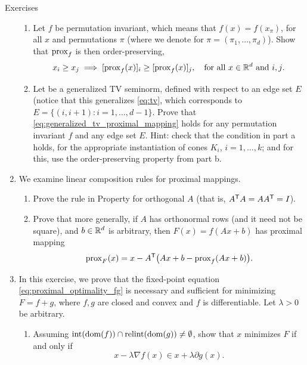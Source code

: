 \begin{xcb}{Exercises}
\begin{enumerate}[label=\thechapter.\arabic*]
\begin{enumerate}[label=\alph*.]
\item Let $f$ be permutation invariant, which means that $f(x) = f(x_\pi)$, for
  all $x$ and permutations $\pi$ (where we denote  for $\pi=(\pi_1,\dots,\pi_d)$). Show that $\operatorname{prox}_f$ is
  then order-preserving,  
 \[
 x_i \geq x_j \implies [\operatorname{prox}_f(x)]_i \geq [\operatorname{prox}_f(x)]_j, \quad \text{for all
   $x \in \mathbb{R}^d$ and $i,j$}.
 \]

\item Let  be a
  generalized TV seminorm, defined with respect to an edge set $E$ (notice that  
  this generalizes \eqref{eq:tv}, which corresponds to $E = \{(i, i+1) : i =
  1,\dots,d-1\}$. Prove that \eqref{eq:generalized_tv_proximal_mapping} holds
  for any permutation invariant $f$ and any edge set $E$. Hint: check that the
  condition in part a holds, for the appropriate instantiation of cones $K_i$,
  $i=1,\dots,k$; and for this, use the order-preserving property from part b.   
\end{enumerate}

\item \label{ex:proximal_linear}
  We examine linear composition rules for proximal mappings. 

\begin{enumerate}[label=\alph*.]
\item Prove the rule in Property  for orthogonal $A$
  (that is, $A^{\mathsf{T}} A = A A^{\mathsf{T}} = I$).   

\item Prove that more generally, if $A$ has orthonormal rows (and it need not be 
  square), and $b \in \mathbb{R}^d$ is arbitrary, then $F(x) = f(Ax + b)$ has proximal
  mapping 
  \[
  \operatorname{prox}_F(x)  = x - A^{\mathsf{T}} \big(Ax + b - \operatorname{prox}_f(Ax + b) \big).
  \]
\end{enumerate}
  
\item \label{ex:proximal_optimality_fg}
  In this exercise, we prove that the fixed-point equation 
  \eqref{eq:proximal_optimality_fg} is necessary and sufficient for minimizing
  $F = f+g$, where $f,g$ are closed and convex and $f$ is differentiable. Let
  $\lambda > 0$ be arbitrary.

\begin{enumerate}[label=\alph*.]
\item Assuming $\operatorname{int}(\operatorname{dom}(f)) \cap \operatorname{relint}(\operatorname{dom}(g)) \not= \emptyset$, show
  that $x$ minimizes $F$ if and only if   
  \[
  x - \lambda \nabla f(x) \in x + \lambda \partial g(x).
  \]
  

\end{enumerate}
\end{enumerate}
\end{xcb}
